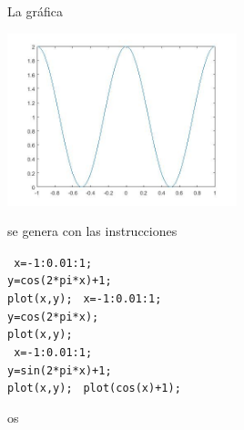 \begin{pregunta}
\begin{cuerpo}
La gráfica 
\begin{center}
\includegraphics[width=0.5\textwidth]{./img/img1.jpg}
\end{center}
se genera con las instrucciones
\end{cuerpo}
\begin{multicols}{2}
\begin{alternativas}
{\texttt{
x=-1:0.01:1; \\
y=cos(2*pi*x)+1; \\
plot(x,y);}}
{\texttt{
x=-1:0.01:1; \\
y=cos(2*pi*x); \\
plot(x,y);}\\} 
{\texttt{
x=-1:0.01:1; \\
y=sin(2*pi*x)+1; \\
plot(x,y);}}
{\texttt{
plot(cos(x)+1);}}
\end{alternativas}
os\end{multicols}
\justificacion{0cm}
\end{pregunta}